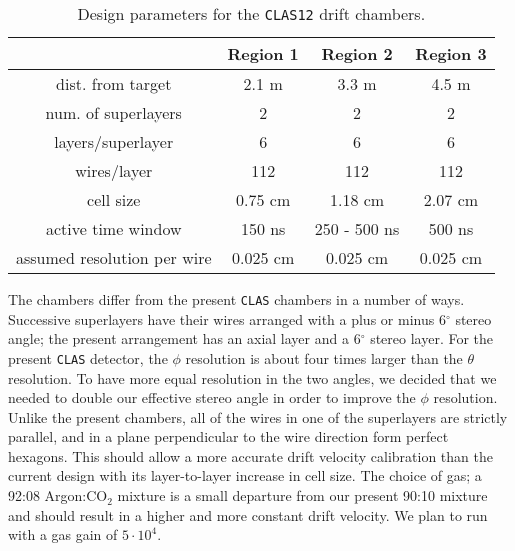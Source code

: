 \begin{table}[htbp]
\begin{center}
\begin{tabular} {||c|c|c|c||} \hline \hline
&{\bf Region 1}      &  {\bf Region 2} & {\bf Region 3}\\ \hline
dist. from target    & 2.1 m & 3.3 m   & 4.5 m \\ \hline
num. of superlayers  & 2 & 2   & 2 \\ \hline
layers/superlayer    & 6 & 6   & 6 \\ \hline
wires/layer          & 112 & 112   & 112 \\ \hline
cell size            & 0.75 cm & 1.18 cm   & 2.07 cm \\ \hline
active time window   & 150 ns & 250 - 500 ns & 500 ns \\ \hline
assumed resolution per wire  & 0.025 cm & 0.025 cm   & 0.025 cm \\ \hline
\end{tabular}
\caption{\small{Design parameters for the {\tt CLAS12} drift chambers.}}
\label{fwd-dc-design-parms}
\end{center}
\end{table}

The chambers differ from the present {\tt CLAS} chambers in a number of 
ways.  Successive superlayers have their wires arranged with a plus or 
minus 6$^{\circ}$ stereo angle; the present arrangement has an axial layer 
and a 6$^{\circ}$ stereo layer.  For the present {\tt CLAS} detector, the 
$\phi$ resolution is about four times larger than the $\theta$ resolution.  
To have more equal resolution in the two angles, we decided that we needed 
to double our effective stereo angle in order to improve the  $\phi$ 
resolution.  Unlike the present chambers, all of the wires in one of the 
superlayers are strictly parallel, and in a plane perpendicular to the wire 
direction form perfect hexagons.  This should allow a more accurate drift 
velocity calibration than the current design with its layer-to-layer 
increase in cell size.  The choice of gas; a 92:08 Argon:CO$_2$ mixture is 
a small departure from our present 90:10 mixture and should result in a 
higher and more constant drift velocity.  We plan to run with a gas gain 
of $5\cdot10^4$.

